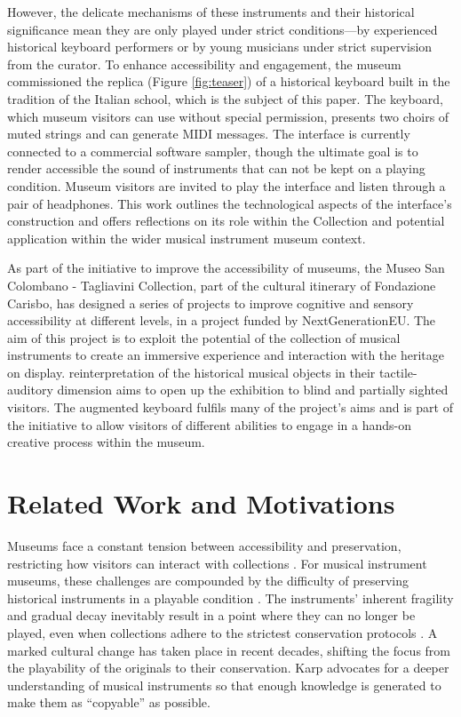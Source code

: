 However, the delicate mechanisms of these instruments and their historical significance mean they are only played under strict conditions—by experienced historical keyboard performers or by young musicians under strict supervision from the curator. 
To enhance accessibility and engagement, the museum commissioned the replica (Figure \ref{fig:teaser}) of a historical keyboard built in the tradition of the Italian school, which is the subject of this paper.
The keyboard, which museum visitors can use without special permission, presents two choirs of muted strings and can generate MIDI messages. The interface is currently connected to a commercial software sampler, though the ultimate goal is to render accessible the sound of instruments that can not be kept on a playing condition. Museum visitors are invited to play the interface and listen through a pair of headphones. This work outlines the technological aspects of the interface's construction and offers reflections on its role within the  Collection and potential application within the wider musical instrument museum context. 

As part of the initiative to improve the accessibility of museums, the Museo San Colombano - Tagliavini Collection, part of the cultural itinerary of Fondazione Carisbo, has designed a series of projects to improve cognitive and sensory accessibility at different levels, in a project funded by NextGenerationEU. The aim of this project is to exploit the potential of the collection of musical instruments to create an immersive experience and interaction with the heritage on display. 
reinterpretation of the historical musical objects in their tactile-auditory dimension aims to open up the exhibition to blind and partially sighted visitors. The augmented keyboard fulfils many of the project's aims and is part of the initiative to allow visitors of different abilities to engage in a hands-on creative process within the museum.

\section{Related Work and Motivations}\label{related-work}

Museums face a constant tension between accessibility and preservation, restricting how visitors can interact with collections \cite{Templeton2018, McAlpine2014}. For musical instrument museums, these challenges are compounded by the difficulty of preserving historical instruments in a playable condition \cite{McAlpine2014}. The instruments' inherent fragility and gradual decay inevitably result in a point where they can no longer be played, even when collections adhere to the strictest conservation protocols \cite{NYT_strad}. A marked cultural change has taken place in recent decades, shifting the focus from the playability of the originals to their conservation. Karp \cite{Karp1979,Karp1985} advocates for a deeper understanding of musical instruments so that enough knowledge is generated to make them as ``copyable'' as possible.

